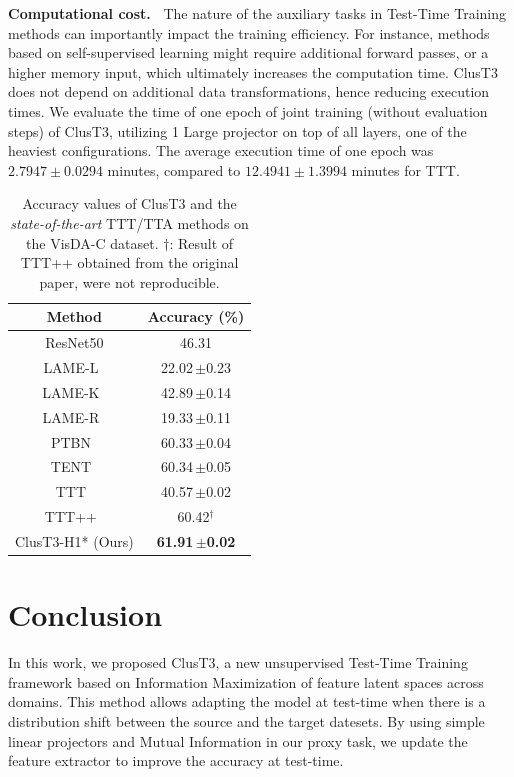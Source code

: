 \documentclass{article}
\newcommand{\mypar}[1]{\vspace{3pt}\noindent\textbf{#1~}}
\newcommand{\ppm}{\,\scriptsize$\pm$}
\newcommand{\dorowcolors}{\rowcolors{2}{gray!15}{white}}
\begin{document}
\mypar{Computational cost.} The nature of the auxiliary tasks in Test-Time Training methods can importantly impact the training efficiency. For instance, methods based on self-supervised learning might require additional forward passes, or a higher memory input, which ultimately increases the computation time. ClusT3 does not depend on additional data transformations, hence reducing execution times. We evaluate the time of one epoch of joint training (without evaluation steps) of ClusT3, utilizing 1 Large projector on top of all layers, one of the heaviest configurations. The average execution time of one epoch was $2.7947\pm0.0294$ minutes, compared to $12.4941\pm1.3994$ minutes for TTT.


\begin{table}[ht!]
\centering
\begin{small}
\dorowcolors
\begin{tabular}{cc}
\toprule
\textbf{Method}        & \textbf{Accuracy (\%)}   \\ \midrule
ResNet50      & 46.31              \\
LAME-L~\cite{lame2022}        & 22.02\ppm 0.23 \\
LAME-K~\cite{lame2022}        & 42.89\ppm 0.14 \\
LAME-R~\cite{lame2022}        & 19.33\ppm 0.11 \\
PTBN~\cite{PTBN}          & 60.33\ppm 0.04 \\
TENT~\cite{tent2021}          & 60.34\ppm 0.05 \\
TTT~\cite{ttt}           &  40.57\ppm 0.02                   \\
TTT++~\cite{ttt++}         & 60.42$^\dagger$              \\ 
ClusT3-H1* (Ours) & \textbf{61.91\ppm 0.02} \\ \bottomrule
\end{tabular}
\end{small}
\caption{Accuracy values of ClusT3 and the \emph{state-of-the-art} TTT/TTA methods on the VisDA-C dataset. $\dagger$: Result of TTT++ obtained from the original paper, were not reproducible.}
\label{tab:visda}
\end{table}

\section{Conclusion}
\label{sec:conclusion}
In this work, we proposed ClusT3, a new unsupervised Test-Time Training framework based on Information Maximization of feature latent spaces across domains. This method allows adapting the model at test-time when there is a distribution shift between the source and the target datesets. By using simple linear projectors and Mutual Information in our proxy task, we update the feature extractor to improve the accuracy at test-time.
\end{document}
